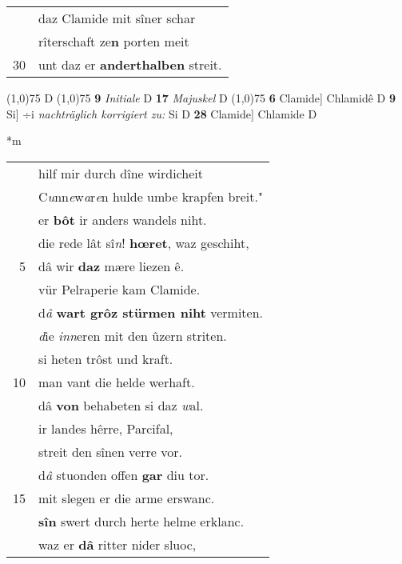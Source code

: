 \documentclass[8pt,a4paper,notitlepage]{article}
\begin{document}
\begin{table}[ht]
\begin{minipage}[t]{0.5\linewidth}
\begin{tabular}{rl}
 & daz Clamide mit sîner schar\\ 
 & rîterschaft ze\textbf{n} porten meit\\ 
30 & unt daz er \textbf{anderthalben} streit.\\ 
\end{tabular}
\scriptsize
\line(1,0){75} \newline
D \newline
\line(1,0){75} \newline
\textbf{9} \textit{Initiale} D  \textbf{17} \textit{Majuskel} D  \newline
\line(1,0){75} \newline
\textbf{6} Clamide] Chlamidê D \textbf{9} Si] ÷i \textit{nachträglich korrigiert zu:} Si D \textbf{28} Clamide] Chlamide D \newline
\end{minipage}
\hspace{0.5cm}
\begin{minipage}[t]{0.5\linewidth}
\small
\begin{center}*m
\end{center}
\begin{tabular}{rl}
 & hilf mir durch dîne wirdicheit\\ 
 & C\textit{u}nn\textit{e}w\textit{a}r\textit{e}n hulde umbe krapfen breit."\\ 
 & er \textbf{bôt} ir anders wandels niht.\\ 
 & die rede lât sî\textit{n}! \textbf{hœret}, waz geschiht,\\ 
5 & dâ wir \textbf{daz} mære liezen ê.\\ 
 & vür Pelraperie kam Clamide.\\ 
 & d\textit{â} \textbf{wart grôz stürmen niht} vermiten.\\ 
 & \textit{d}ie \textit{inn}eren mit den ûzern striten.\\ 
 & si heten trôst und kraft.\\ 
10 & man vant die helde werhaft.\\ 
 & dâ \textbf{von} behabeten si daz \textit{w}al.\\ 
 & ir landes hêrre, Parcifal,\\ 
 & streit den sînen verre vor.\\ 
 & d\textit{â} stuonden offen \textbf{gar} diu tor.\\ 
15 & mit slegen er die arme erswanc.\\ 
 & \textbf{sîn} swert durch herte helme erklanc.\\ 
 & waz er \textbf{dâ} ritter nider sluoc,\\ 

\end{tabular}
\end{minipage}
\end{table}
\end{document}

